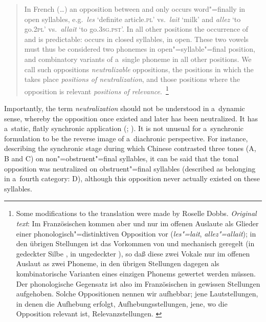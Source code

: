 			\begin{quotation}
				In {French} ({\dots}) an opposition between  and  only occurs word"=finally in open syllables, e.g.~\textit{les} ‘definite article.\textsc{pl}’ vs.\ \textit{lait} ‘milk’ and \textit{allez} ‘to go.2\textsc{pl}’ vs.\ \textit{allait} ‘to go.3\textsc{sg.pst}’. In all other positions the occurrence
				of  and  is predictable:  occurs in closed syllables,  in open. These
				two vowels must thus be considered two phonemes in open"=syllable"=final position, and combinatory
				variants of a~single phoneme in all other positions. We call such oppositions
				\textit{neutralizable} oppositions, the positions in which the  takes place
				\textit{positions of neutralization}, and those positions where the opposition is relevant
				\textit{positions of relevance}.~\citep[78]{trubetzkoy1969}\footnote{Some modifications to the translation were made by Roselle Dobbs. \textit{Original text}: Im
					Französischen kommen aber  und  nur im offenen Auslaute als Glieder einer
					phonologisch"=distinktiven Opposition vor (\textit{les"=lait}, \textit{allez"=allait}); in den
					übrigen Stellungen ist das Vorkommen von  und  mechanisch geregelt (in gedeckter
					Silbe , in ungedeckter ), so daß diese zwei Vokale nur im offenen Auslaut as zwei
					Phoneme, in den übrigen Stellungen dagegen als kombinatorische Varianten eines einzigen Phonems
					gewertet werden müssen. Der phonologische Gegensatz ist also im Französischen in gewissen
					Stellungen a{\kern2pt}u{\kern2pt}f{\kern2pt}g{\kern2pt}e{\kern2pt}h{\kern2pt}o{\kern2pt}b{\kern2pt}e{\kern2pt}n. Solche Oppositionen nennen wir
					a{\kern2pt}u{\kern2pt}f{\kern2pt}\-h{\kern2pt}e{\kern2pt}b{\kern2pt}\-b{\kern2pt}a{\kern2pt}r; jene
					Lautstellungen, in denen die Aufhebung erfolgt,
					A{\kern2pt}u{\kern2pt}f{\kern2pt}\-h{\kern2pt}e{\kern2pt}\-b{\kern2pt}u{\kern2pt}n{\kern2pt}g{\kern2pt}s{\kern2pt}\-s{\kern2pt}t{\kern2pt}e{\kern2pt}l{\kern2pt}l{\kern2pt}u{\kern2pt}n{\kern2pt}g{\kern2pt}e{\kern2pt}n,
					jene, wo die Opposition relevant ist,
					R{\kern2pt}e{\kern2pt}l{\kern2pt}e{\kern2pt}v{\kern2pt}a{\kern2pt}n{\kern2pt}z{\kern2pt}\-s{\kern2pt}t{\kern2pt}e{\kern2pt}l{\kern2pt}\-l{\kern2pt}u{\kern2pt}n{\kern2pt}g{\kern2pt}e{\kern2pt}n. \citep[70]{trubetzkoy1939}}
			\end{quotation}
			
			Importantly, the term \textit{neutralization} should not be understood in a~dynamic sense, whereby the
			opposition once existed and later has been neutralized. It has a~static, flatly synchronic
			application (\citealt[257--259]{martinet1969}; \citeyear[87--89]{martinet1970}). It is not unusual for a~synchronic formulation to be the
			reverse image of a~{diachronic} perspective. For instance, describing the synchronic stage during which Chinese contrasted three tones (A, B and C) on non"=obstruent"=final syllables, it can be said that
			the tonal opposition was neutralized on obstruent"=final syllables (described as belonging in
			a~fourth category: D), although this opposition never actually existed on these syllables.
			

